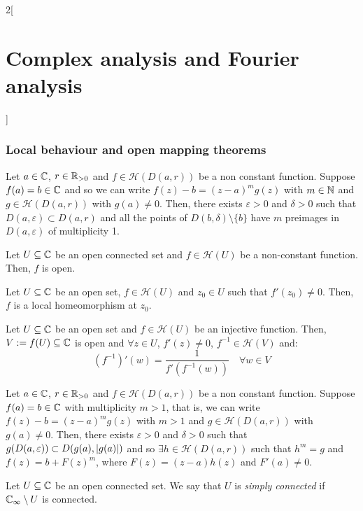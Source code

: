 \documentclass[../../../main.tex]{subfiles}
\begin{document}
\begin{multicols}{2}[\section{Complex analysis and Fourier analysis}]
  \subsubsection{Local behaviour and open mapping theorems}
  \begin{theorem}
    Let $a\in\mathbb{C}$, $r\in\mathbb{R}_{>0}$ and $f\in\mathcal{H}(D(a,r))$ be a non constant function. Suppose $f(a)=b\in \mathbb{C}$ and so we can write $f(z)-b={(z-a)}^mg(z)$ with $m\in\mathbb{N}$ and $g\in\mathcal{H}(D(a,r))$ with $g(a)\ne 0$. Then, there exists $\varepsilon>0$ and $\delta>0$ such that $D(a,\varepsilon)\subset D(a,r)$ and all the points of $D(b,\delta)\setminus\{b\}$ have $m$ preimages in $D(a,\varepsilon)$ of multiplicity 1.
  \end{theorem}
  \begin{theorem}
    Let $U\subseteq\mathbb{C}$ be an open connected set and $f\in\mathcal{H}(U)$ be a non-constant function. Then, $f$ is open.
  \end{theorem}
  \begin{corollary}
    Let $U\subseteq\mathbb{C}$ be an open set, $f\in\mathcal{H}(U)$ and $z_0\in U$ such that $f'(z_0)\ne 0$. Then, $f$ is a local homeomorphism at $z_0$.
  \end{corollary}
  \begin{corollary}
    Let $U\subseteq\mathbb{C}$ be an open set and $f\in\mathcal{H}(U)$ be an injective function. Then, $V:=f(U)\subseteq \mathbb{C}$ is open and $\forall z\in U$, $f'(z)\ne 0$, $f^{-1}\in \mathcal{H}(V)$ and: $${(f^{-1})}'(w)=\frac{1}{f'(f^{-1}(w))}\quad\forall w\in V$$
  \end{corollary}
  \begin{theorem}
    Let $a\in\mathbb{C}$, $r\in\mathbb{R}_{>0}$ and $f\in\mathcal{H}(D(a,r))$ be a non constant function. Suppose $f(a)=b\in \mathbb{C}$ with multiplicity $m>1$, that is, we can write $f(z)-b={(z-a)}^mg(z)$ with $m>1$ and $g\in\mathcal{H}(D(a,r))$ with $g(a)\ne 0$. Then, there exists $\varepsilon>0$ and $\delta>0$ such that $g(D(a,\varepsilon))\subset D(g(a),\abs{g(a)})$ and so $\exists h\in \mathcal{H}(D(a,r))$ such that $h^m=g$ and $f(z)=b+{F(z)}^m$, where $F(z)=(z-a)h(z)$ and $F'(a)\ne 0$.
  \end{theorem}
  \begin{definition}
    Let $U\subseteq\mathbb{C}$ be an open connected set. We say that $U$ is \emph{simply connected} if $\mathbb{C}_\infty\setminus U$ is connected.
  \end{definition}
  \begin{proposition}

\end{proposition}
\end{multicols}
\end{document}
